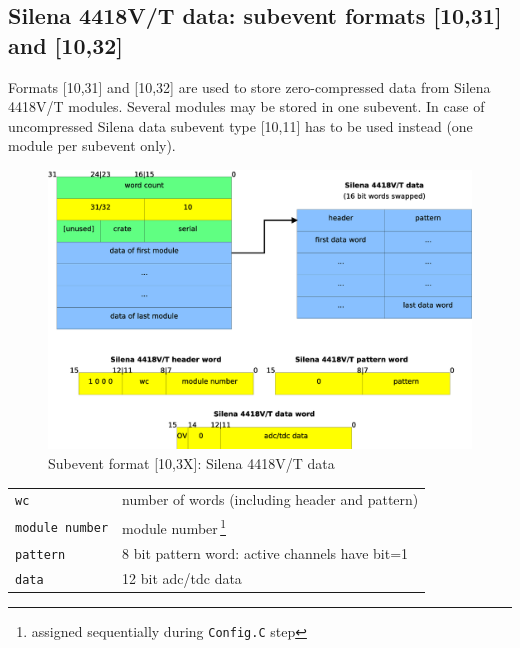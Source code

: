 \documentclass[10pt,a4paper]{article}
\begin{document}
\subsection{Silena 4418V/T data: subevent formats [10,31] and [10,32]}
Formats [10,31] and [10,32] are used to store zero-compressed data from Silena 4418V/T modules.
Several modules may be stored in one subevent. In case of uncompressed Silena data subevent type [10,11]
has to be used instead (one module per subevent only).
\begin{figure}[H]
\centerline{\includegraphics[width=\linewidth]{MedSevt_Silena}}
\caption{Subevent format [10,3X]: Silena 4418V/T data}
\label{MedSevt_Silena}
\end{figure}
\begin{minipage}{\linewidth}
\begin{table}[H]
\begin{center}
\begin{tabular}{ll}
\hline
\verb+wc+ & number of words (including header and pattern) \\
\verb+module number+ & module number\,\footnote{assigned sequentially during \texttt{Config.C} step} \\
\verb+pattern+ & 8 bit pattern word: active channels have bit=1 \\
\verb+data+ & 12 bit adc/tdc data \\
\hline
\end{tabular}
\end{center}
\label{MedSevt_Silena_Legend}
\end{table}
\end{minipage}
\newpage
\end{document}
